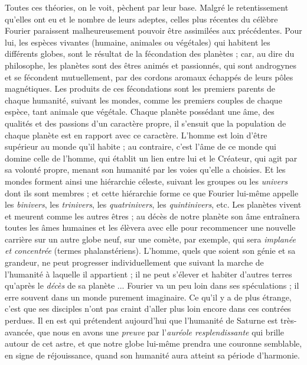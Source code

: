\documentclass[a4paper, 11pt, oneside]{article}
\begin{document}
Toutes ces théories, on le voit, pèchent par leur base. Malgré le retentissement qu'elles ont eu et le nombre de leurs adeptes, celles plus récentes du célèbre Fourier paraissent malheureusement pouvoir être assimilées aux précédentes. Pour lui, les espèces vivantes (humaine, animales ou végétales) qui habitent les différents globes, sont le résultat de la fécondation des planètes ; car, au dire du philosophe, les planètes sont des êtres animés et passionnés, qui sont androgynes et se fécondent mutuellement, par des cordons aromaux échappés de leurs pôles magnétiques. Les produits de ces fécondations sont les premiers parents de chaque humanité, suivant les mondes, comme les premiers couples de chaque espèce, tant animale que végétale. Chaque planète possédant une âme, des qualités et des passions d'un caractère propre, il s'ensuit que la population de chaque planète est en rapport avec ce caractère. L'homme est loin d'être supérieur au monde qu'il habite ; au contraire, c'est l'âme de ce monde qui domine celle de l'homme, qui établit un lien entre lui et le Créateur, qui agit par sa volonté propre, menant son humanité par les voies qu'elle a choisies. Et les mondes forment ainsi une hiérarchie céleste, suivant les groupes ou les \emph{univers} dont ils sont membres ; et cette hiérarchie forme ce que Fourier lui-même appelle les \emph{binivers}, les \emph{trinivers}, les \emph{quatrinivers}, les \emph{quintinivers}, etc. Les planètes vivent et meurent comme les autres êtres ; au décès de notre planète son âme entraînera toutes les âmes humaines et les élèvera avec elle pour recommencer une nouvelle carrière sur un autre globe neuf, sur une comète, par exemple, qui sera \emph{implanée et concentrée} (termes phalanstériens). L'homme, quels que soient son génie et sa grandeur, ne peut progresser individuellement que suivant la marche de l'humanité à laquelle il appartient ; il ne peut s'élever et habiter d'autres terres qu'après le \emph{décès} de sa planète ... Fourier va un peu loin dans ses spéculations ; il erre souvent dans un monde purement imaginaire. Ce qu'il y a de plus étrange, c'est que ses disciples n'ont pas craint d'aller plus loin encore dans ces contrées perdues. Il en est qui prétendent aujourd'hui que l'humanité de Saturne est très-avancée, que nous en avons une \emph{preuve} par l'\emph{auréole resplendissante} qui brille autour de cet astre, et que notre globe lui-même prendra une couronne semblable, en signe de réjouissance, quand son humanité aura atteint sa période d'harmonie.
\end{document}
